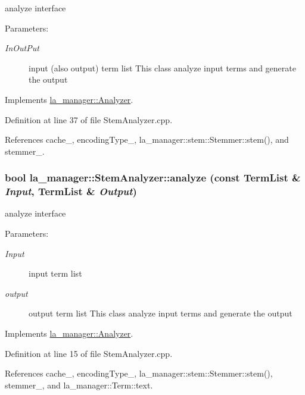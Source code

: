 analyze interface 

\begin{Desc}
\item[Parameters:]
\begin{description}
\item[{\em InOutPut}]input (also output) term list This class analyze input terms and generate the output \end{description}
\end{Desc}


Implements \hyperlink{classla__manager_1_1Analyzer_23414b773ec2070957e9aa3d6a7d8b78}{la\_\-manager::Analyzer}.

Definition at line 37 of file StemAnalyzer.cpp.

References cache\_\-, encodingType\_\-, la\_\-manager::stem::Stemmer::stem(), and stemmer\_\-.\hypertarget{classla__manager_1_1StemAnalyzer_bd1334a97df94c78f58a02a7af73d55a}{
\subsubsection[{analyze}]{\setlength{\rightskip}{0pt plus 5cm}bool la\_\-manager::StemAnalyzer::analyze (const {\bf TermList} \& {\em Input}, \/  {\bf TermList} \& {\em Output})}}
\label{classla__manager_1_1StemAnalyzer_bd1334a97df94c78f58a02a7af73d55a}


analyze interface 

\begin{Desc}
\item[Parameters:]
\begin{description}
\item[{\em Input}]input term list \item[{\em output}]output term list This class analyze input terms and generate the output \end{description}
\end{Desc}


Implements \hyperlink{classla__manager_1_1Analyzer_a096ba4b2faeaa0f3938d7b826ab1c78}{la\_\-manager::Analyzer}.

Definition at line 15 of file StemAnalyzer.cpp.

References cache\_\-, encodingType\_\-, la\_\-manager::stem::Stemmer::stem(), stemmer\_\-, and la\_\-manager::Term::text.

